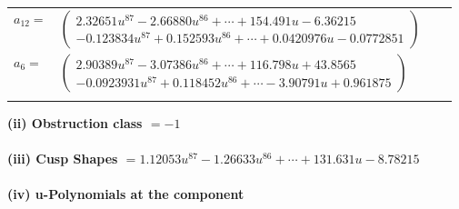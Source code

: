 \documentclass[1p]{elsarticle_modified}
\theoremstyle{definition}
\begin{document}
\begin{tabular}{m{7pt} m{180pt} m{7pt} m{180pt} }
\flushright $a_{12}=$&$\begin{pmatrix}2.32651 u^{87}-2.66880 u^{86}+\cdots+154.491 u-6.36215\\-0.123834 u^{87}+0.152593 u^{86}+\cdots+0.0420976 u-0.0772851\end{pmatrix}$ \\
\flushright $a_{6}=$&$\begin{pmatrix}2.90389 u^{87}-3.07386 u^{86}+\cdots+116.798 u+43.8565\\-0.0923931 u^{87}+0.118452 u^{86}+\cdots-3.90791 u+0.961875\end{pmatrix}$\\&\end{tabular}
\flushleft \textbf{(ii) Obstruction class $= -1$}\\~\\
\flushleft \textbf{(iii) Cusp Shapes $= 1.12053 u^{87}-1.26633 u^{86}+\cdots+131.631 u-8.78215$}\\~\\
\newpage\renewcommand{\arraystretch}{1}
\flushleft \textbf{(iv) u-Polynomials at the component}\newline \\
\end{document}
